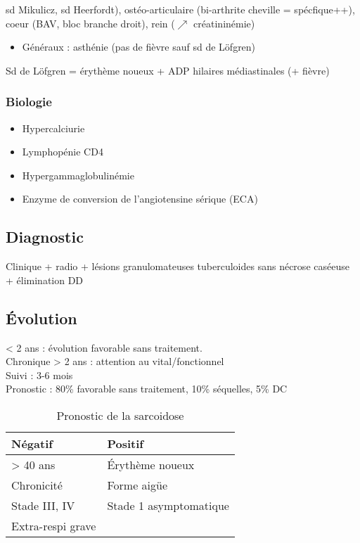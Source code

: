 \documentclass{book}
\begin{document}
sd Mikulicz, sd Heerfordt), ostéo-articulaire (bi-arthrite cheville =
spécfique++), 
coeur (BAV, bloc branche droit), rein (\(\nearrow\) créatininémie)

\begin{itemize}
\item Généraux : asthénie (pas de fièvre sauf sd de Löfgren)
\end{itemize}

Sd de Löfgren = érythème noueux + ADP hilaires médiastinales (+ fièvre)
\subsubsection{Biologie}
\label{sec:org4ec7b0b}
\label{sec:orgbfe5d87}

\begin{itemize}
\item Hypercalciurie
\item Lymphopénie CD4
\item Hypergammaglobulinémie
\item Enzyme de conversion de l'angiotensine sérique (ECA)
\end{itemize}

\subsection{Diagnostic}
\label{sec:org0f3eeef}
\label{sec:org6670330}
Clinique + radio + lésions granulomateuses tuberculoides sans nécrose caséeuse +
élimination DD
\subsection{Évolution}
\label{sec:org39e6964}
\label{sec:org707f9ea}
< 2 ans : évolution favorable sans traitement.\\
Chronique > 2 ans : attention au vital/fonctionnel \\
Suivi : 3-6 mois\\
Pronostic : 80\% favorable sans traitement, 10\% séquelles, 5\% DC

\begin{table}[htbp]
  \caption{Pronostic de la sarcoidose}
  \centering
  \begin{tabular}{ll}
    \toprule
    Négatif & Positif\\
    \midrule
    > 40 ans & Érythème noueux\\
    Chronicité & Forme aigüe\\
    Stade III, IV & Stade 1 asymptomatique\\
    Extra-respi grave & \\
    \bottomrule
  \end{tabular}
\end{table}
\end{document}
